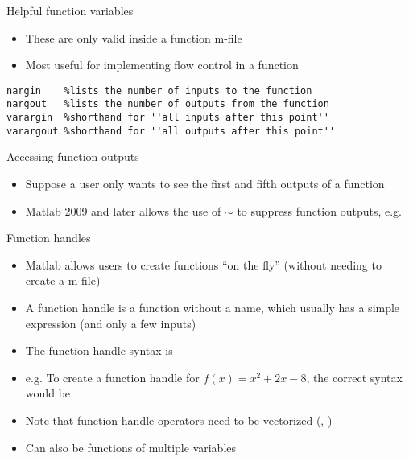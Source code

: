 \documentclass[english,xcolor=dvipsnames]{beamer}
\begin{document}
\begin{frame}[fragile]{Helpful function variables}
\begin{itemize}
	\item These are only valid inside a function m-file
	\item Most useful for implementing flow control in a function
\end{itemize}
\begin{lstlisting}
nargin    %lists the number of inputs to the function
nargout   %lists the number of outputs from the function
varargin  %shorthand for ''all inputs after this point''
varargout %shorthand for ''all outputs after this point''
\end{lstlisting}
\end{frame}

\begin{frame}[fragile]{Accessing function outputs}
\begin{itemize}
	\item Suppose a user only wants to see the first and fifth outputs of a function
	\item Matlab 2009 and later allows the use of $\sim$ to suppress function outputs, e.g. 
\end{itemize}
\end{frame}

\begin{frame}{Function handles}
\begin{itemize}
	\item Matlab allows users to create functions ``on the fly'' (without needing to create a m-file)
	\item A function handle is a function without a name, which usually has a simple expression (and only a few inputs)
	\item The function handle syntax is 
	\item e.g. To create a function handle for $f(x)=x^2 + 2x - 8$, the correct syntax would be 
	\item Note that function handle operators need to be vectorized (, )
	\item Can also be functions of multiple variables
\end{itemize}
\end{frame}
\end{document}
